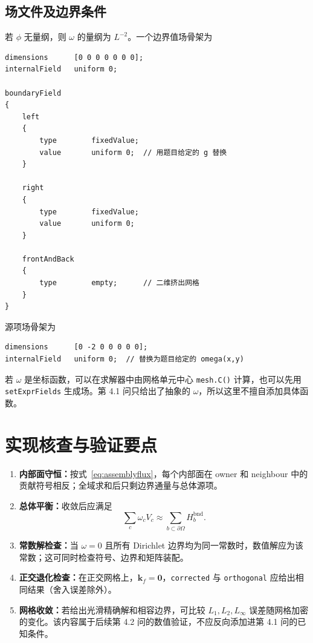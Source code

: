 \documentclass[UTF8,a4paper,11pt]{ctexart}
\newcommand{\vect}[1]{\bm{#1}}
\newcommand{\kf}{\vect k_f}
\begin{document}
\subsection{场文件及边界条件}

若 \(\phi\) 无量纲，则 \(\omega\) 的量纲为 \(L^{-2}\)。一个边界值场骨架为
\begin{lstlisting}[language=OpenFOAM,caption={0/phi 的边界骨架}]
dimensions      [0 0 0 0 0 0 0];
internalField   uniform 0;

boundaryField
{
    left
    {
        type        fixedValue;
        value       uniform 0;  // 用题目给定的 g 替换
    }

    right
    {
        type        fixedValue;
        value       uniform 0;
    }

    frontAndBack
    {
        type        empty;      // 二维挤出网格
    }
}
\end{lstlisting}
源项场骨架为
\begin{lstlisting}[language=OpenFOAM,caption={0/omega 的量纲与内部场}]
dimensions      [0 -2 0 0 0 0 0];
internalField   uniform 0;  // 替换为题目给定的 omega(x,y)
\end{lstlisting}
若 \(\omega\) 是坐标函数，可以在求解器中由网格单元中心 \texttt{mesh.C()} 计算，也可以先用 \texttt{setExprFields} 生成场。第 4.1 问只给出了抽象的 \(\omega\)，所以这里不擅自添加具体函数。

\section{实现核查与验证要点}

\begin{enumerate}
  \item \textbf{内部面守恒：}按式~\eqref{eq:assemblyflux}，每个内部面在 owner 和 neighbour 中的贡献符号相反；全域求和后只剩边界通量与总体源项。
  \item \textbf{总体平衡：}收敛后应满足
  \[
    \sum_{c}\omega_cV_c
    \approx
    \sum_{b\subset\partial\Omega}H_b^{\mathrm{bnd}}.
  \]
  \item \textbf{常数解检查：}当 \(\omega=0\) 且所有 Dirichlet 边界均为同一常数时，数值解应为该常数；这可同时检查符号、边界和矩阵装配。
  \item \textbf{正交退化检查：}在正交网格上，\(\kf=\vect0\)，\texttt{corrected} 与 \texttt{orthogonal} 应给出相同结果（舍入误差除外）。
  \item \textbf{网格收敛：}若给出光滑精确解和相容边界，可比较 \(L_1,L_2,L_\infty\) 误差随网格加密的变化。该内容属于后续第 4.2 问的数值验证，不应反向添加进第 4.1 问的已知条件。
\end{enumerate}
\end{document}
